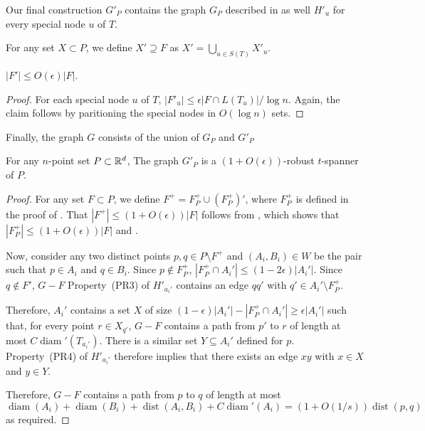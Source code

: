 \documentclass{patmorin}
\DeclareMathOperator{\diam}{diam}
\DeclareMathOperator{\dist}{dist}
\begin{document}
Our final construction $G'_P$ contains the graph $G_P$ described in
 as well $H'_u$ for every special node $u$ of $T$.

For any set $X\subset P$, we define $X'\supseteq F$ as 
$X' = \bigcup_{u\in S(T)} X'_u$.

\begin{clm}
  $|F'| \le O(\epsilon)|F|$.
\end{clm}

\begin{proof}
  For each special node $u$ of $T$, $|F'_u|\le \epsilon|F\cap L(T_u)|/\log
  n$.  Again, the claim follows by paritioning the special nodes in
  $O(\log n)$ sets.
\end{proof}

Finally, the graph $G$ consists of the union of $G_P$ and $G'_P$


\begin{clm}
  For any $n$-point set $P\subset\mathbb{R}^d$, The graph $G'_P$  is a
  $(1+O(\epsilon))$-robust $t$-spanner of $P$.
\end{clm}

\begin{proof}
  For any set $F\subset P$, we define $F^+ = F^+_P \cup (F^+_P)'$, where
  $F^+_P$ is defined in the proof of .  That $|F^+|
  \le (1+O(\epsilon))|F|$ follows from , which
  shows that $|F^+_P|\le (1+O(\epsilon))|F|$ and .

  Now, consider any two distinct points $p,q\in P\setminus F^+$ and
  $(A_i,B_i)\in W$ be the pair such that $p\in A_i$ and $q\in B_i$.
  Since $p\not\in F^+_P$, $|F^+_P\cap A_i'|\le (1-2\epsilon)|A_i'|$.
  Since $q\not\in F'$, $G-F$ Property~(PR3) of $H'_{a_i'}$ contains
  an edge $qq'$ with $q'\in A_i'\setminus F^+_P$.

  Therefore, $A_i'$ contains a set $X$ of size
  $(1-\epsilon)|A_i'|-|F^+_P\cap A_i'|\ge \epsilon|A_i'|$ such that, for
  every point $r\in X_{q'}$, $G-F$ contains a path from $p'$ to $r$ of
  length at most $C\diam'(T_{a_i'})$.  There is a similar set $Y\subseteq
  A_i'$ defined for $p$.  Property~(PR4) of $H'_{a_i'}$ therefore implies
  that there exists an edge $xy$ with $x\in X$ and $y\in Y$.

  Therefore, $G-F$ contains a path from $p$ to $q$ of length at most
  \[  \diam(A_i) + \diam(B_i) + \dist(A_i,B_i) + C\diam'(A_i) = (1+O(1/s))\dist(p,q)
  \]
  as required.
\end{proof}




\end{document}
